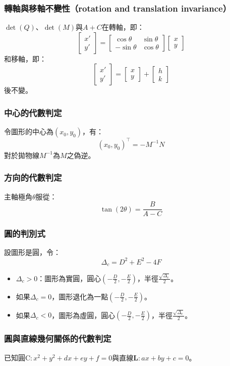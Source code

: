 \documentclass[a4paper,12pt]{article}
\begin{document}
\subsubsection{轉軸與移軸不變性（rotation and translation invariance）}
$\det(Q)$、$\det(M)$與$A+C$在轉軸，即：
\[\begin{bmatrix} x' \\ y' \end{bmatrix} = \begin{bmatrix} \cos\theta & \sin\theta \\ -\sin\theta & \cos\theta \end{bmatrix}\begin{bmatrix} x \\ y \end{bmatrix}\]
和移軸，即：
\[\begin{bmatrix} x' \\ y' \end{bmatrix} = \begin{bmatrix} x \\ y \end{bmatrix}+\begin{bmatrix} h \\ k \end{bmatrix}\]
後不變。
\subsubsection{中心的代數判定}
令圖形的中心為$(x_0,y_0)$，有：
\[(x_0,y_0)^{\top}=-M^{-1}N\]
對於拋物線$M^{-1}$為$M$之偽逆。
\subsubsection{方向的代數判定}
主軸極角$\theta$服從：
\[\tan(2\theta)=\frac{B}{A-C}\]
\subsubsection{圓的判別式}
設圖形是圓，令：
\[\Delta_c=D^2+E^2-4F\]
\begin{itemize}
\item $\Delta_c>0$：圖形為實圓，圓心$(-\frac{D}{2},-\frac{E}{2})$，半徑$\frac{\sqrt{\Delta_c}}{2}$。
\item 如果$\Delta_c=0$，圖形退化為一點$(-\frac{D}{2},-\frac{E}{2})$。
\item 如果$\Delta_c<0$，圖形為虛圓，圓心$(-\frac{D}{2},-\frac{E}{2})$，半徑$\frac{\sqrt{\Delta_c}}{2}$。
\end{itemize}
\subsubsection{圓與直線幾何關係的代數判定}
已知圓$\mathrm{C}:x^2+y^2+dx+ey+f=0$與直線$\mathbf{L}:ax+by+c=0$。
\end{document}
